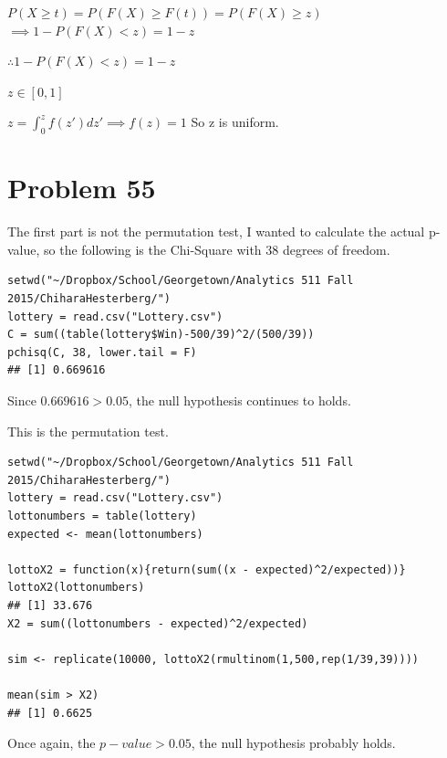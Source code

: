 \documentclass{article}\usepackage[]{graphicx}\usepackage[]{color}
\makeatletter
\newenvironment{kframe}{%
 \def\at@end@of@kframe{}%
 \ifinner\ifhmode%
  \def\at@end@of@kframe{\end{minipage}}%
  \begin{minipage}{\columnwidth}%
 \fi\fi%
 \def\FrameCommand##1{\hskip\@totalleftmargin \hskip-\fboxsep
 \colorbox{shadecolor}{##1}\hskip-\fboxsep
     \hskip-\linewidth \hskip-\@totalleftmargin \hskip\columnwidth}%
 \MakeFramed {\advance\hsize-\width
   \@totalleftmargin\z@ \linewidth\hsize
   \@setminipage}}%
 {\par\unskip\endMakeFramed%
 \at@end@of@kframe}
\newenvironment{knitrout}{}{} %
\makeatother
\begin{document}
$P(X\geq t)=P(F(X)\geq F(t))=P(F(X)\geq z)$
$\implies 1-P(F(X)<z)=1-z$

$\therefore 1-P(F(X)<z)=1-z$

$z\in [0,1]$

$z = \int^{z}_{0} f(z') dz'\implies f(z)=1$ So z is uniform.

\section*{Problem 55}

The first part is not the permutation test, I wanted to calculate the actual p-value, so the following is the Chi-Square with 38 degrees of freedom.
\begin{knitrout}
\color{fgcolor}\begin{kframe}
\begin{verbatim}
setwd("~/Dropbox/School/Georgetown/Analytics 511 Fall 2015/ChiharaHesterberg/")
lottery = read.csv("Lottery.csv")
C = sum((table(lottery$Win)-500/39)^2/(500/39))
pchisq(C, 38, lower.tail = F)
## [1] 0.669616
\end{verbatim}
\end{kframe}
\end{knitrout}
Since $0.669616 > 0.05$, the null hypothesis continues to holds.

This is the permutation test. 
\begin{knitrout}
\color{fgcolor}\begin{kframe}
\begin{verbatim}
setwd("~/Dropbox/School/Georgetown/Analytics 511 Fall 2015/ChiharaHesterberg/")
lottery = read.csv("Lottery.csv")
lottonumbers = table(lottery)
expected <- mean(lottonumbers)

lottoX2 = function(x){return(sum((x - expected)^2/expected))}
lottoX2(lottonumbers)
## [1] 33.676
X2 = sum((lottonumbers - expected)^2/expected)

sim <- replicate(10000, lottoX2(rmultinom(1,500,rep(1/39,39))))

mean(sim > X2)
## [1] 0.6625
\end{verbatim}
\end{kframe}
\end{knitrout}
Once again, the $p-value > 0.05$, the null hypothesis probably holds.
\end{document}
